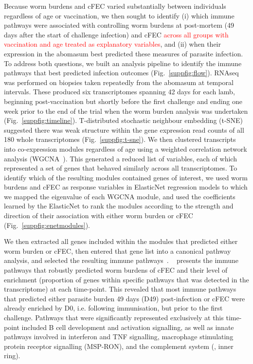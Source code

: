\documentclass[a4paper, hidelinks, 11pt]{article}
\begin{document}
Because worm burdens and cFEC varied substantially between individuals
regardless of age or vaccination, we then sought to identify (i) which immune
pathways were associated with controlling worm burdens at post-mortem (49 days
after the start of challenge infection) and cFEC \textcolor{red}{across all groups with vaccination and age treated as explanatory variables}, and (ii) when their
expression in the abomasum best predicted these measures of parasite infection.
To address both questions, we built an analysis pipeline to identify the immune
pathways that best predicted infection outcomes (Fig.~\ref{suppfig:flow}).
RNAseq was performed on biopsies taken repeatedly from the abomasum at temporal
intervals. These produced six transcriptomes spanning 42 days for each lamb,
beginning post-vaccination but shortly before the first challenge and ending
one week prior to the end of the trial when the worm burden analysis was
undertaken (Fig.~\ref{suppfig:timeline}). T-distributed stochastic neighbour
embedding (t-SNE) suggested there was weak structure within the gene expression
read counts of all 180 whole transcriptomes (Fig.~\ref{suppfig:t-sne}). We then
clustered transcripts into co-expression modules regardless of age using a
weighted correlation network analysis (WGCNA~\supercite{Langfelder2008}). This
generated a reduced list of variables, each of which represented a set of genes
that behaved similarly across all transcriptomes. To identify which of the
resulting modules contained genes of interest, we used worm burdens and cFEC as
response variables in ElasticNet regression models to which we mapped the
eigenvalue of each WGCNA module, and used the coefficients learned by the
ElasticNet to rank the modules according to the strength and direction of their
association with either worm burden or cFEC (Fig.~\ref{suppfig:enetmodules}).

We then extracted all genes included within the modules that predicted either
worm burden or cFEC, then entered that gene list into a canonical pathway
analysis, and selected the resulting immune pathways~\supercite{Kramer2014}.
~ presents the immune pathways that robustly predicted
worm burdens of cFEC and their level of enrichment (proportion of genes within
specific pathways that was detected in the transcriptome) at each time-point.
This revealed that most immune pathways that predicted either parasite burden
49 days (D49) post-infection or cFEC were already enriched by D0, i.e.
following immunisation, but prior to the first challenge. Pathways that were
significantly represented exclusively at this time-point included B cell
development and activation signalling, as well as innate pathways involved in
interferon and TNF signalling, macrophage stimulating protein receptor
signalling (MSP-RON), and the complement system (, inner
ring).
\end{document}
